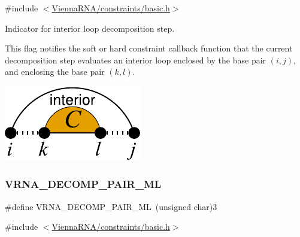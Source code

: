{\ttfamily \#include $<$\hyperlink{constraints_2basic_8h}{Vienna\+R\+N\+A/constraints/basic.\+h}$>$}



Indicator for interior loop decomposition step. 

This flag notifies the soft or hard constraint callback function that the current decomposition step evaluates an interior loop enclosed by the base pair $(i,j)$, and enclosing the base pair $(k,l)$.

 
\begin{DoxyImageNoCaption}
  \mbox{\includegraphics[width=\textwidth,height=\textheight/2,keepaspectratio=true]{decomp_il}}
\end{DoxyImageNoCaption}
 \mbox{\label{group__constraints_gaa15b1185673f0b9e900c4748d45f388f}} 
\subsubsection{\texorpdfstring{V\+R\+N\+A\+\_\+\+D\+E\+C\+O\+M\+P\+\_\+\+P\+A\+I\+R\+\_\+\+ML}{VRNA\_DECOMP\_PAIR\_ML}}
{\footnotesize\ttfamily \#define V\+R\+N\+A\+\_\+\+D\+E\+C\+O\+M\+P\+\_\+\+P\+A\+I\+R\+\_\+\+ML~(unsigned char)3}



{\ttfamily \#include $<$\hyperlink{constraints_2basic_8h}{Vienna\+R\+N\+A/constraints/basic.\+h}$>$}



